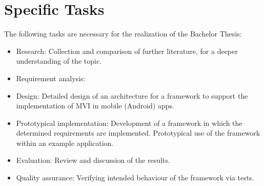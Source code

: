 \section{Specific Tasks}
\label{sec:specific-tasks}

The following tasks are necessary for the realization of the Bachelor Thesis:
%
\begin{itemize}
    \item Research: Collection and comparison of further literature, for a deeper understanding of the topic.
    \item Requirement analysis:
    \item Design: Detailed design of an architecture for a framework to support the implementation of MVI in mobile (Android) apps.
    \item Prototypical implementation: Development of a framework in which the determined requirements are implemented.
    Prototypical use of the framework within an example application.
    \item Evaluation: Review and discussion of the results.
    \item Quality assurance: Verifying intended behaviour of the framework via tests.
\end{itemize}